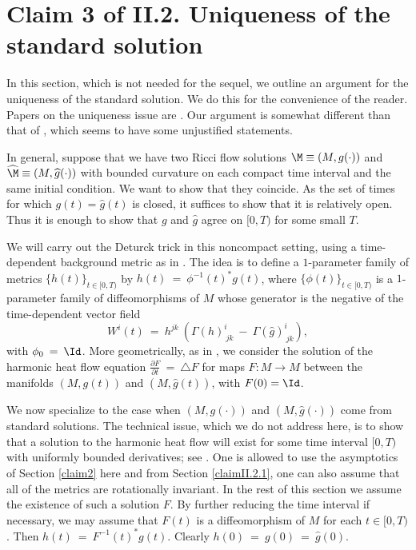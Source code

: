\section{Claim 3 of II.2. Uniqueness of the standard solution} \label{claim3}

In this section, which is not needed for the sequel,
we outline an argument for the
uniqueness of the standard solution.
We do this for the convenience of the reader.
Papers on the uniqueness issue are
\cite{Chen-Zhu,Lu-Tian}.
Our argument is somewhat different than that of
\cite[Proof of Claim 3 of Section 2]{Perelman2},
which seems to have some unjustified statements.

In general,
suppose that we have
two Ricci flow solutions $\M \equiv (M, g(\cdot))$ and
$\widehat{\M} \equiv (M, \widehat{g}(\cdot))$ with bounded curvature
on each compact time interval and the same initial condition.
We want to show that they coincide.
As the set of times for which $g(t) = \widehat{g}(t)$
is closed, it suffices to show that it is relatively open.  Thus
it is enough to show that $g$ and $\widehat{g}$ agree on $[0, T)$
for some small $T$.

We will carry out the Deturck trick in this noncompact setting,
using a time-dependent background metric as in
\cite[Section 2]{Anderson-Chow}. The idea is to
define a $1$-parameter family of metrics $\{h(t)\}_{t \in [0, T)}$ by
$h(t) \: = \: \phi^{-1}(t)^* g(t)$, where
$\{\phi(t)\}_{t \in [0, T)}$ is a $1$-parameter family of
diffeomorphisms of $M$ whose generator is the negative of the time-dependent
vector field
\begin{equation} \label{Weqn}
W^i(t) \: = \: h^{jk} \: \left( \Gamma(h)^i_{\: jk} \: - \:
\Gamma(\widehat{g})^i_{\: jk} \right),
\end{equation}
with $\phi_0 \: = \: \Id$.
More geometrically, as in \cite[Section 6]{Hamilton}, we consider
the solution of the harmonic heat flow equation
$\frac{\partial F}{\partial t} \: = \: \triangle F$ for maps
$F : M \rightarrow M$ between the
manifolds $(M, g(t))$ and $(M, \widehat{g}(t))$, with $F(0) = \Id$.

We now specialize to the case when
$(M, g(\cdot))$ and
$(M, \widehat{g}(\cdot))$ come from standard solutions.
The technical issue, which we do not address here, is to show
that a solution to the harmonic heat flow
will exist for some time interval $[0, T)$ with uniformly
bounded derivatives; see \cite{Chen-Zhu}.
One is allowed to use the asymptotics of
Section \ref{claim2} here and
from Section \ref{claimII.2.1},
one can also assume that all of the metrics are
rotationally invariant. In the rest of this section we assume
the existence of such a solution $F$.
By further reducing the time interval if
necessary, we may assume that $F(t)$ is a diffeomorphism of $M$
for each $t \in [0, T)$. Then $h(t) \: = \: F^{-1}(t)^* g(t)$.
Clearly $h(0) \: = \: g(0) \: = \:
\widehat{g}(0)$.

